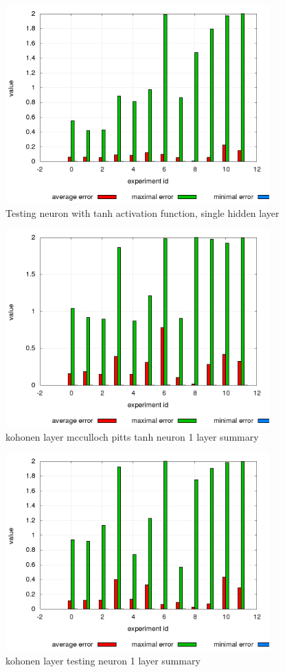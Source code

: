 \documentclass[10pt,a5paper]{article}
\begin{document}
\begin{figure}[!ht]
\centering
\includegraphics[width=4.0in]{images/testing_neuron_1_layer_summary_result_log.png}
\caption{Testing neuron with tanh activation function, single hidden layer}
\label{img:testing_neuron_1_layer_summary}
\end{figure}

\begin{figure}[!ht]
\centering
\includegraphics[width=4.0in]{images/kohonen_layer_mcculloch_pitts_tanh_neuron_1_layer_summary_result_log.png}
\caption{kohonen layer mcculloch pitts tanh neuron 1 layer summary}
\label{img:kohonen_layer_mcculloch_pitts_tanh_neuron_1_layer_summary}
\end{figure}

\begin{figure}[!ht]
\centering
\includegraphics[width=4.0in]{images/kohonen_layer_testing_neuron_1_layer_summary_result_log.png}
\caption{kohonen layer testing neuron 1 layer summary}
\label{img:kohonen_layer_testing_neuron_1_layer_summary}
\end{figure}
\end{document}
